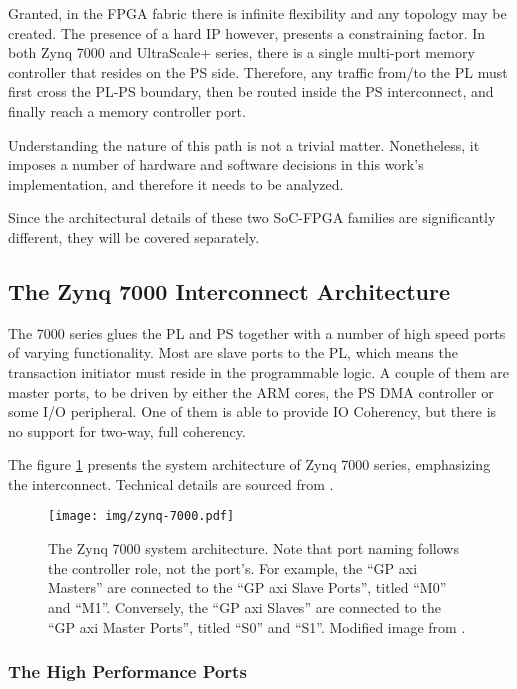 Granted, in the FPGA fabric there is infinite flexibility and any topology may be created.
The presence of a hard IP however, presents a constraining factor.
In both Zynq 7000 and UltraScale+ series, 
there is a single multi-port memory controller
that resides on the PS side. Therefore, any traffic from/to the PL must
first cross the PL-PS boundary, then be routed inside the PS interconnect,
and finally reach a memory controller port. 

Understanding the nature of this path is not a trivial matter. 
Nonetheless, it imposes a number of hardware and software decisions
in this work's implementation, and therefore it needs to be analyzed.

Since the architectural details of these two SoC-FPGA families are
significantly different, they will be covered separately.

\subsection{The Zynq 7000 Interconnect Architecture}

The 7000 series glues the PL and PS together with a number of
high speed ports of varying functionality. Most are slave ports to the
PL, which means the transaction initiator must reside in the programmable logic.
A couple of them are master ports, to be driven by either the ARM cores,
the PS DMA controller or some I/O peripheral. 
One of them is able to provide \gls{IO Coherency},
but there is no support for two-way, full coherency.

The figure \ref{fig:zynq7000-interconnect} presents the system architecture 
of Zynq 7000 series, emphasizing the interconnect. 
Technical details are sourced from \cite{ug585}.

\begin{figure}[htbp]
  \centering
  \texttt{[image: img/zynq-7000.pdf]}
  \caption{The Zynq 7000 system architecture. 
  Note that port naming follows the controller role, not the port's.
  For example, the ``GP \gls{axi} Masters'' are connected to the
  ``GP \gls{axi} Slave Ports'', titled ``M0'' and ``M1''. Conversely,
  the ``GP \gls{axi} Slaves'' are connected to the ``GP \gls{axi} Master Ports'', titled ``S0'' and ``S1''.
  Modified image from \cite{ug585}.
  }
  \label{fig:zynq7000-interconnect}
\end{figure}

\subsubsection{The High Performance Ports}
\label{sect:zynq7000-hp}

